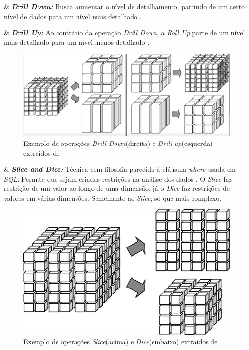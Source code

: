 \begin{easylist}[itemize]

	& \textbf{\textit{Drill Down:}} Busca aumentar o nível de detalhamento, partindo de um certo nível de dados para um nível mais detalhado \cite{neeraj_sharma_2011}.  
	
	& \textbf{\textit{Drill Up:}} Ao contrário da operação \textit{Drill Down}, a \textit{Roll Up} parte de um nível mais detalhado para um nível menos detalhado  \cite{neeraj_sharma_2011}.\\
	
	
	\begin{figure}[h!]
\centering
\includegraphics[keepaspectratio=false,scale=0.45]{figuras/figuras_nilton/drillDownUp.png}
\caption{Exemplo de operações \textit{Drill Down}(direita) e \textit{Drill up}(esquerda) extraídos de }
\label{fig:drillUpDown}
\end{figure}
\FloatBarrier
	
	& \textbf{\textit{Slice and Dice:}} Técnica com filosofia parecida à cláusula \textit{where} usada em \textit{SQL}. Permite que sejam criadas restrições na análise dos dados \cite{valeria2012}. O \textit{Slice} faz restrição de um valor ao longo de uma dimensão, já o \textit{Dice} faz restrições de valores em várias dimensões. Semelhante ao \textit{Slice}, só que mais complexo.\\
	
	
		\begin{figure}[h!]
\centering
\includegraphics[keepaspectratio=false,scale=2.0]{figuras/figuras_nilton/sliceDice.eps}
\caption{Exemplo de operações \textit{Slice}(acima) e \textit{Dice}(embaixo) extraídos de }
\label{fig:sliceDice}
\end{figure}
\FloatBarrier
	

\end{easylist}
